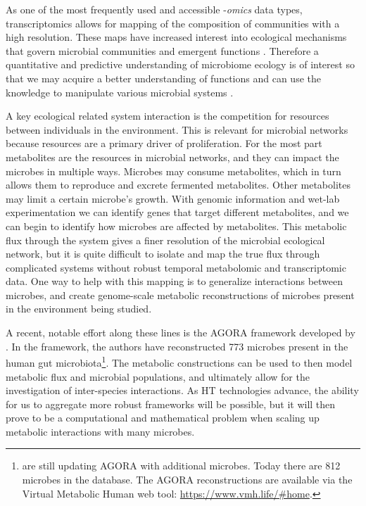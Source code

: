As one of the most frequently used and accessible -\textit{omics} data types, transcriptomics allows for mapping of the composition of communities with a high resolution. These maps have increased interest into ecological mechanisms that govern microbial communities and emergent functions \citep{Costello2012}. Therefore a quantitative and predictive understanding of microbiome ecology is of interest so that we may acquire a better understanding of functions and can use the knowledge to manipulate various microbial systems \citep{Goldford2018}. 

A key ecological related system interaction is the competition for resources between individuals in the environment. This is relevant for microbial networks because resources are a primary driver of proliferation. For the most part metabolites are the resources in microbial networks, and they can impact the microbes in multiple ways. Microbes may consume metabolites, which in turn allows them to reproduce and excrete fermented metabolites. Other metabolites may limit a certain microbe's growth. With genomic information and wet-lab experimentation we can identify genes that target different metabolites, and we can begin to identify how microbes are affected by metabolites. This metabolic flux through the system gives a finer resolution of the microbial ecological network, but it is quite difficult to isolate and map the true flux through complicated systems without robust temporal metabolomic and transcriptomic data. One way to help with this mapping is to generalize interactions between microbes, and create genome-scale metabolic reconstructions of microbes present in the environment being studied. 

A recent, notable effort along these lines is the \acrfull{AGORA} framework developed by \cite{Magnusdottir2016}. In the framework, the authors have reconstructed 773 microbes present in the human gut microbiota\footnote{\citeauthor{Magnusdottir2016} are still updating \acrshort{AGORA} with additional microbes. Today there are 812 microbes in the database. The \acrshort{AGORA} reconstructions are available via the Virtual Metabolic Human web tool: \url{https://www.vmh.life/\#home}.}. The metabolic constructions can be used to then model metabolic flux and microbial populations, and ultimately allow for the investigation of inter-species interactions. As \acrshort{HT} technologies advance, the ability for us to aggregate more robust frameworks will be possible, but it will then prove to be a computational and mathematical problem when scaling up metabolic interactions with many microbes. 

